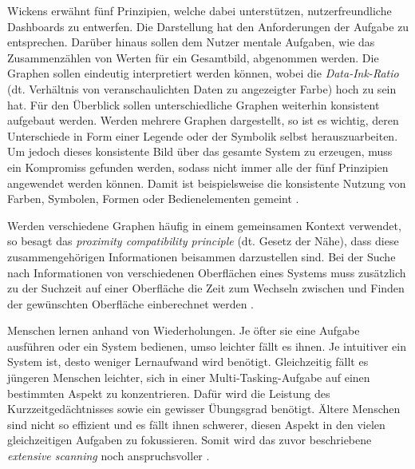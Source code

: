 Wickens erwähnt fünf Prinzipien, welche dabei unterstützen, nutzerfreundliche Dash\-boards zu entwerfen. Die Darstellung hat den Anforderungen der Aufgabe zu entsprechen. Darüber hinaus sollen dem Nutzer mentale Aufgaben, wie das Zusammenzählen von Werten für ein Gesamtbild, abgenommen werden. Die Graphen sollen eindeutig interpretiert werden können, wobei die \textit{Data-Ink-Ratio} (dt. Verhältnis von veranschaulichten Daten zu angezeigter Farbe) hoch zu sein hat. Für den Überblick sollen unterschiedliche Graphen weiterhin konsistent aufgebaut werden.
Werden mehrere Graphen dargestellt, so ist es wichtig, deren Unterschiede in Form einer Legende oder der Symbolik selbst herauszuarbeiten. Um jedoch dieses konsistente Bild über das gesamte System zu erzeugen, muss ein Kompromiss gefunden werden, sodass nicht immer alle der fünf Prinzipien angewendet werden können. Damit ist beispielsweise die konsistente Nutzung von Farben, Symbolen, Formen oder Bedienelementen gemeint \cites[S. 169]{Vollrath:2015:Taschenbuch}[S. 86, 93, 406]{Wickens:2013}.

Werden verschiedene Graphen häufig in einem gemeinsamen Kontext verwendet, so besagt das \textit{proximity compatibility principle} (dt. Gesetz der Nähe), dass diese zusammengehörigen Informationen beisammen darzustellen sind.
Bei der Suche nach Informationen von verschiedenen Oberflächen eines Systems muss zusätzlich zu der Suchzeit auf einer Oberfläche die Zeit zum Wechseln zwischen und Finden der gewünschten Oberfläche einberechnet werden
\cites[S. 473\psqq]{Wickens:1995}[S. 50\psqq]{Wickens:2013}.

Menschen lernen anhand von Wiederholungen. Je öfter sie eine Aufgabe ausführen oder ein System bedienen, umso leichter fällt es ihnen. Je intuitiver ein System ist, desto weniger Lernaufwand wird benötigt. Gleichzeitig fällt es jüngeren Menschen leichter, sich in einer Multi-Tasking-Aufgabe auf einen bestimmten Aspekt zu konzentrieren. Dafür wird die Leistung des Kurzzeitgedächtnisses sowie ein gewisser Übungsgrad benötigt. Ältere Menschen sind nicht so effizient und es fällt ihnen schwerer, diesen Aspekt in den vielen gleichzeitigen Aufgaben zu fokussieren. Somit wird das zuvor beschriebene \textit{extensive scanning} noch anspruchsvoller \cite[S. 344]{Wickens:2013}.

